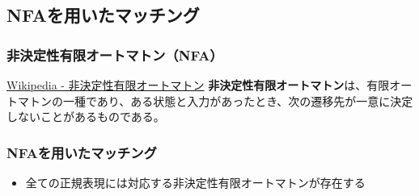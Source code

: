 \documentclass[12pt, unicode, svgnames, handout]{beamer}
\begin{document}
\subsection{NFAを用いたマッチング}
\begin{frame}[fragile]
  \frametitle{非決定性有限オートマトン（NFA）}
  
  \begin{block}{}
    \begin{shadequote}[r]{\scriptsize\href{https://ja.wikipedia.org/wiki/\%E9\%9D\%9E\%E6\%B1\%BA\%E5\%AE\%9A\%E6\%80\%A7\%E6\%9C\%89\%E9\%99\%90\%E3\%82\%AA\%E3\%83\%BC\%E3\%83\%88\%E3\%83\%9E\%E3\%83\%88\%E3\%83\%B3}{Wikipedia - 非決定性有限オートマトン}}
      \textbf{非決定性有限オートマトン}は、有限オートマトンの一種であり、ある状態と入力があったとき、次の遷移先が一意に決定しないことがあるものである。
    \end{shadequote}
  \end{block}

\end{frame}

\begin{frame}[fragile]
  \frametitle{NFAを用いたマッチング}

  \begin{itemize}
    \item 全ての正規表現には対応する非決定性有限オートマトンが存在する
  \end{itemize}
\end{frame}
\end{document}
